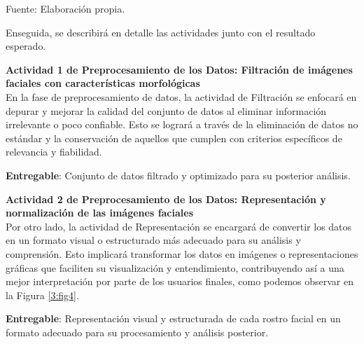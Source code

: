 \begin{longtable}{>{\raggedright\arraybackslash}p{4cm} >{\raggedright\arraybackslash}p{4cm} >{\raggedright\arraybackslash}p{5cm}}
\end{longtable}

\begin{flushleft}
	\small Fuente: Elaboración propia.
\end{flushleft}

Enseguida, se describirá en detalle las actividades junto con el resultado esperado.

\textbf{Actividad 1 de Preprocesamiento de los Datos: Filtración de imágenes faciales con características morfológicas}
\\
En la fase de preprocesamiento de datos, la actividad de Filtración se enfocará en depurar y mejorar la calidad del conjunto de datos al eliminar información irrelevante o poco confiable. Esto se logrará a través de la eliminación de datos no estándar y la conservación de aquellos que cumplen con criterios específicos de relevancia y fiabilidad. 

\textbf{Entregable}: Conjunto de datos filtrado y optimizado para su posterior análisis.

\textbf{Actividad 2 de Preprocesamiento de los Datos: Representación y normalización de las imágenes faciales}
\\
Por otro lado, la actividad de Representación se encargará de convertir los datos en un formato visual o estructurado más adecuado para su análisis y comprensión. Esto implicará transformar los datos en imágenes o representaciones gráficas que faciliten su visualización y entendimiento, contribuyendo así a una mejor interpretación por parte de los usuarios finales, como podemos observar en la Figura \ref{3:fig4}.

\textbf{Entregable}: Representación visual y estructurada de cada rostro facial en un formato adecuado para su procesamiento y análisis posterior.

